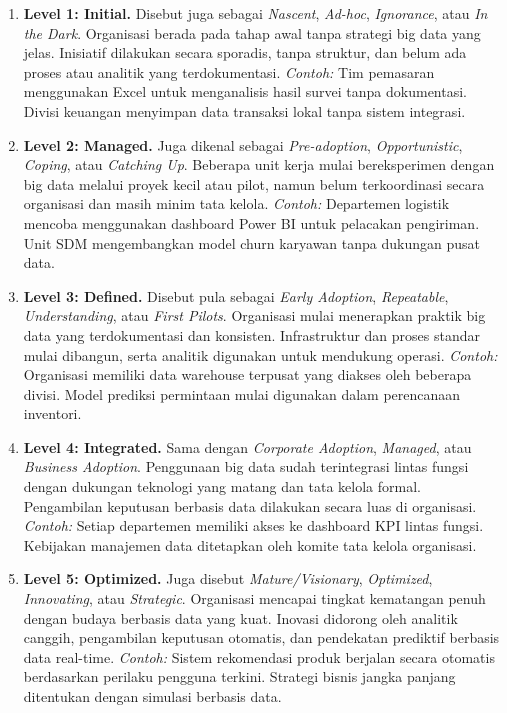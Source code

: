 \begin{enumerate}
	\item \textbf{Level 1: Initial.} Disebut juga sebagai \textit{Nascent}, \textit{Ad-hoc}, \textit{Ignorance}, atau \textit{In the Dark}. Organisasi berada pada tahap awal tanpa strategi big data yang jelas. Inisiatif dilakukan secara sporadis, tanpa struktur, dan belum ada proses atau analitik yang terdokumentasi. \textit{Contoh:}  Tim pemasaran menggunakan Excel untuk menganalisis hasil survei tanpa dokumentasi. Divisi keuangan menyimpan data transaksi lokal tanpa sistem integrasi.
	
	\item \textbf{Level 2: Managed.} Juga dikenal sebagai \textit{Pre-adoption}, \textit{Opportunistic}, \textit{Coping}, atau \textit{Catching Up}. Beberapa unit kerja mulai bereksperimen dengan big data melalui proyek kecil atau pilot, namun belum terkoordinasi secara organisasi dan masih minim tata kelola. \textit{Contoh:}  Departemen logistik mencoba menggunakan dashboard Power BI untuk pelacakan pengiriman. Unit SDM mengembangkan model churn karyawan tanpa dukungan pusat data.
	
	\item \textbf{Level 3: Defined.} Disebut pula sebagai \textit{Early Adoption}, \textit{Repeatable}, \textit{Understanding}, atau \textit{First Pilots}. Organisasi mulai menerapkan praktik big data yang terdokumentasi dan konsisten. Infrastruktur dan proses standar mulai dibangun, serta analitik digunakan untuk mendukung operasi. \textit{Contoh:}  Organisasi memiliki data warehouse terpusat yang diakses oleh beberapa divisi. Model prediksi permintaan mulai digunakan dalam perencanaan inventori.
	
	\item \textbf{Level 4: Integrated.} Sama dengan \textit{Corporate Adoption}, \textit{Managed}, atau \textit{Business Adoption}. Penggunaan big data sudah terintegrasi lintas fungsi dengan dukungan teknologi yang matang dan tata kelola formal. Pengambilan keputusan berbasis data dilakukan secara luas di organisasi. \textit{Contoh:}  Setiap departemen memiliki akses ke dashboard KPI lintas fungsi. Kebijakan manajemen data ditetapkan oleh komite tata kelola organisasi.
	
	\item \textbf{Level 5: Optimized.} Juga disebut \textit{Mature/Visionary}, \textit{Optimized}, \textit{Innovating}, atau \textit{Strategic}. Organisasi mencapai tingkat kematangan penuh dengan budaya berbasis data yang kuat. Inovasi didorong oleh analitik canggih, pengambilan keputusan otomatis, dan pendekatan prediktif berbasis data real-time. \textit{Contoh:}  Sistem rekomendasi produk berjalan secara otomatis berdasarkan perilaku pengguna terkini. Strategi bisnis jangka panjang ditentukan dengan simulasi berbasis data.
\end{enumerate}



